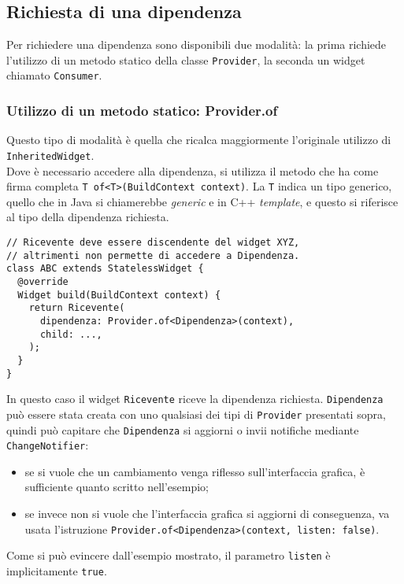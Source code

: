 \subsection{Richiesta di una dipendenza}
\label{subsec:richiesta-dipendenza-flutter}

Per richiedere una dipendenza sono disponibili due modalità: la prima richiede l'utilizzo di un metodo statico della classe \texttt{Provider}, la seconda un widget chiamato \texttt{Consumer}.

\subsubsection{Utilizzo di un metodo statico: Provider.of}
\label{subsubsec:utilizzo-metodo-statico-providerof-flutter}

Questo tipo di modalità è quella che ricalca maggiormente l'originale utilizzo di \texttt{InheritedWidget}.\\
Dove è necessario accedere alla dipendenza, si utilizza il metodo che ha come firma completa \texttt{T of<T>(BuildContext context)}.
La \texttt{T} indica un tipo generico, quello che in Java si chiamerebbe \emph{generic} e in C++ \emph{template}, e questo si riferisce al tipo della dipendenza richiesta.

\begin{lstlisting}
// Ricevente deve essere discendente del widget XYZ,
// altrimenti non permette di accedere a Dipendenza.
class ABC extends StatelessWidget {
  @override
  Widget build(BuildContext context) {
    return Ricevente(
      dipendenza: Provider.of<Dipendenza>(context),
      child: ...,
    );
  }
}
\end{lstlisting}
In questo caso il widget \texttt{Ricevente} riceve la dipendenza richiesta.
\texttt{Dipendenza} può essere stata creata con uno qualsiasi dei tipi di \texttt{Provider} presentati sopra, quindi può capitare che \texttt{Dipendenza} si aggiorni o invii notifiche mediante \texttt{ChangeNotifier}:
\begin{itemize}
    \item se si vuole che un cambiamento venga riflesso sull'interfaccia grafica, è sufficiente quanto scritto nell'esempio;
    \item se invece non si vuole che l'interfaccia grafica si aggiorni di conseguenza, va usata l'istruzione \texttt{Provider.of<Dipendenza>(context, listen: false)}.
\end{itemize}
Come si può evincere dall'esempio mostrato, il parametro \texttt{listen} è implicitamente \texttt{true}.

